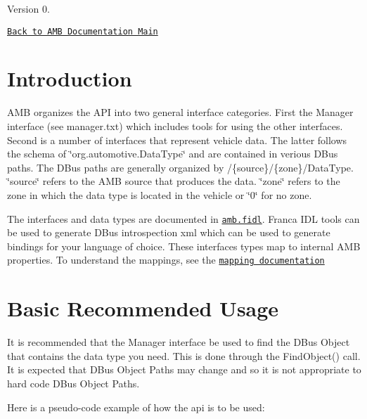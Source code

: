 \begin{DoxyVersion}{Version}
0.
\end{DoxyVersion}
\href{../../html/index.html}{\tt Back to A\+M\+B Documentation Main}\hypertarget{index_intro}{}\section{Introduction}\label{index_intro}
A\+M\+B organizes the A\+P\+I into two general interface categories. First the Manager interface (see manager.\+txt) which includes tools for using the other interfaces. Second is a number of interfaces that represent vehicle data. The latter follows the schema of \char`\"{}org.\+automotive.\+Data\+Type\char`\"{} and are contained in verious D\+Bus paths. The D\+Bus paths are generally organized by /\{source\}/\{zone\}/\+Data\+Type. \char`\"{}source\char`\"{} refers to the A\+M\+B source that produces the data. \char`\"{}zone\char`\"{} refers to the zone in which the data type is located in the vehicle or \char`\"{}0\char`\"{} for no zone.

The interfaces and data types are documented in \href{amb.fidl}{\tt amb.\+fidl}. Franca I\+D\+L tools can be used to generate D\+Bus introspection xml which can be used to generate bindings for your language of choice. These interfaces types map to internal A\+M\+B properties. To understand the mappings, see the \href{ambdbusmappings_8idl.html}{\tt mapping documentation}\hypertarget{index_basic_usage}{}\section{Basic Recommended Usage}\label{index_basic_usage}
It is recommended that the Manager interface be used to find the D\+Bus Object that contains the data type you need. This is done through the Find\+Object() call. It is expected that D\+Bus Object Paths may change and so it is not appropriate to hard code D\+Bus Object Paths.

Here is a pseudo-\/code example of how the api is to be used\+:


